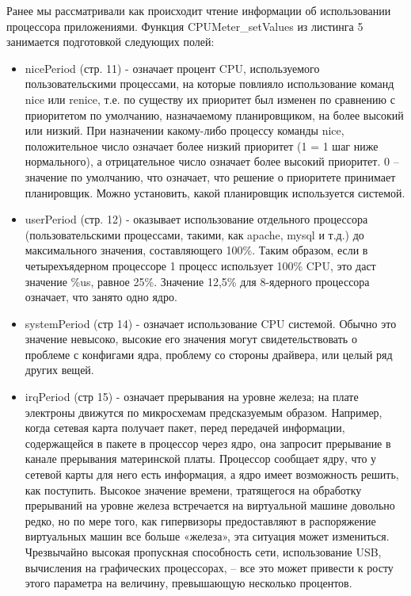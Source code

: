 \documentclass[a4paper, 12pt]{article}		%
\begin{document}
Ранее мы рассматривали как происходит чтение информации об использовании процессора приложениями. Функция CPUMeter\_setValues из листинга 5 занимается подготовкой следующих полей\cite{HowTo}:
\begin{itemize}
\item nicePeriod (стр. 11) - означает процент CPU, используемого пользовательскими процессами, на которые повлияло использование команд nice или renice, т.е. по существу их приоритет был изменен по сравнению с приоритетом по умолчанию, назначаемому планировщиком, на более высокий или низкий. При назначении какому-либо процессу команды nice, положительное число означает более низкий приоритет (1 = 1 шаг ниже нормального), а отрицательное число означает более высокий приоритет. 0 -- значение по умолчанию, что означает, что решение о приоритете принимает планировщик. Можно установить, какой планировщик используется системой.
\item userPeriod (стр. 12) - оказывает использование отдельного процессора (пользовательскими процессами, такими, как apache, mysql и т.д.) до максимального значения, составляющего 100\%. Таким образом, если в четырехъядерном процессоре 1 процесс использует 100\% CPU, это даст значение \%us, равное 25\%. Значение 12,5\% для 8-ядерного процессора означает, что занято одно ядро.
\item systemPeriod (стр 14) - означает использование CPU системой. Обычно это значение невысоко, высокие его значения могут свидетельствовать о проблеме с конфигами ядра, проблему со стороны драйвера, или целый ряд других вещей.
\item irqPeriod (стр 15) - означает прерывания на уровне железа; на плате электроны движутся по микросхемам предсказуемым образом. Например, когда сетевая карта получает пакет, перед передачей информации, содержащейся в пакете в процессор через ядро, она запросит прерывание в канале прерывания материнской платы. Процессор сообщает ядру, что у сетевой карты для него есть информация, а ядро имеет возможность решить, как поступить. Высокое значение времени, тратящегося на обработку прерываний на уровне железа встречается на виртуальной машине довольно редко, но по мере того, как гипервизоры предоставляют в распоряжение виртуальных машин все больше «железа», эта ситуация может измениться. Чрезвычайно высокая пропускная способность сети, использование USB, вычисления на графических процессорах, -- все это может привести к росту этого параметра на величину, превышающую несколько процентов.

\end{itemize}
\end{document}
